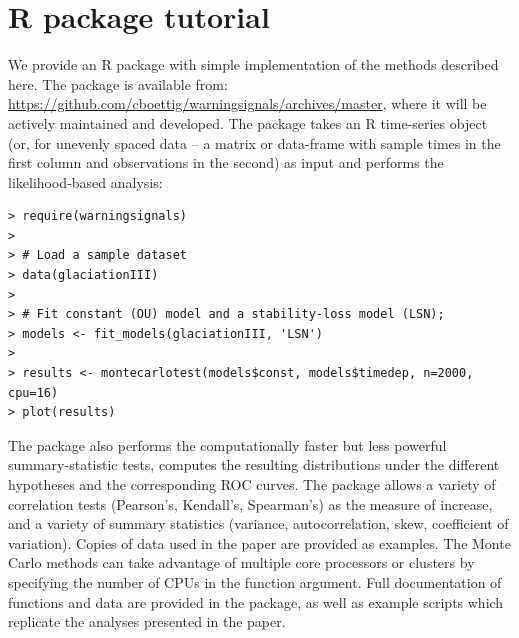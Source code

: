 \documentclass[11pt]{elsarticle}
\begin{document}
\section{R package tutorial}\label{R}
We provide an R package with simple implementation of the methods described here.  The package is available from: \href{https://github.com/cboettig/warningsignals/archives/master}{https://github.com/cboettig/warningsignals/archives/master}, where it will be actively maintained and developed.  The package takes an R time-series object (or, for unevenly spaced data -- a matrix or data-frame with sample times in the first column and observations in the second) as input and performs the likelihood-based analysis:

\begin{verbatim}
> require(warningsignals)
>
> # Load a sample dataset
> data(glaciationIII)
>
> # Fit constant (OU) model and a stability-loss model (LSN);
> models <- fit_models(glaciationIII, 'LSN')
>
> results <- montecarlotest(models$const, models$timedep, n=2000, cpu=16)
> plot(results)
\end{verbatim}

The package also performs the computationally faster but less powerful summary-statistic tests, computes the resulting distributions under the different hypotheses and the corresponding ROC curves.  The package allows a variety of correlation tests (Pearson's, Kendall's, Spearman's) as the measure of increase, and a variety of summary statistics (variance, autocorrelation, skew, coefficient of variation).  Copies of data used in the paper are provided as examples.  The Monte Carlo methods can take advantage of multiple core processors or clusters by specifying the number of CPUs in the function argument.   Full documentation of functions and data are provided in the package, as well as example scripts which replicate the analyses presented in the paper.   

 \section*{ }%
 

 
\end{document}
